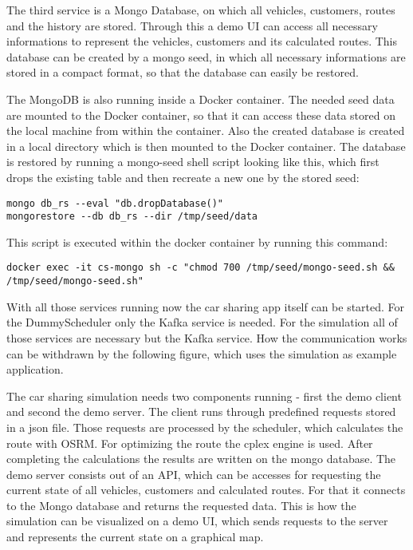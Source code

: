 The third service is a Mongo Database, on which all vehicles, customers, routes and the history are stored. Through this a demo UI can access all necessary informations to represent the vehicles, customers and its calculated routes. This database can be created by a mongo seed, in which all necessary informations are stored in a compact format, so that the database can easily be restored. 

The MongoDB is also running inside a Docker container. The needed seed data are mounted to the Docker container, so that it can access these data stored on the local machine from within the container. Also the created database is created in a local directory which is then mounted to the Docker container. The database is restored by running a mongo-seed shell script looking like this, which first drops the existing table and then recreate a new one by the stored seed:


\begin{lstlisting}
mongo db_rs --eval "db.dropDatabase()"
mongorestore --db db_rs --dir /tmp/seed/data
\end{lstlisting}

This script is executed within the docker container by running this command:

\begin{lstlisting}
docker exec -it cs-mongo sh -c "chmod 700 /tmp/seed/mongo-seed.sh && /tmp/seed/mongo-seed.sh"
\end{lstlisting}

With all those services running now the car sharing app itself can be started. For the DummyScheduler only the Kafka service is needed. For the simulation all of those services are necessary but the Kafka service. How the communication works can be withdrawn by the following figure, which uses the simulation as example application.


The car sharing simulation needs two components running - first the demo client and second the demo server. The client runs through predefined requests stored in a json file. Those requests are processed by the scheduler, which calculates the route with OSRM. For optimizing the route the cplex engine is used. After completing the calculations the results are written on the mongo database. The demo server consists out of an API, which can be accesses for requesting the current state of all vehicles, customers and calculated routes. For that it connects to the Mongo database and returns the requested data. This is how the simulation can be visualized on a demo UI, which sends requests to the server and represents the current state on a graphical map.

